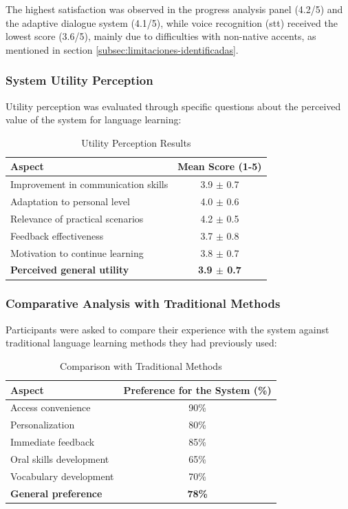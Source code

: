 The highest satisfaction was observed in the progress analysis panel (4.2/5) and the adaptive dialogue system (4.1/5), while voice recognition (\gls{stt}) received the lowest score (3.6/5), mainly due to difficulties with non-native accents, as mentioned in section \ref{subsec:limitaciones-identificadas}.


\subsubsection{System Utility Perception}
\label{subsubsec:percepcion_utilidad}

Utility perception was evaluated through specific questions about the perceived value of the system for language learning: 

\begin{table}[h]
\centering
\caption{Utility Perception Results}
\label{table:percepcion_utilidad}
\begin{tabular}{|l|c|}
\hline
\textbf{Aspect} & \textbf{Mean Score (1-5)} \\
\hline
Improvement in communication skills & 3.9 $\pm$ 0.7 \\
\hline
Adaptation to personal level & 4.0 $\pm$ 0.6 \\
\hline
Relevance of practical scenarios & 4.2 $\pm$ 0.5 \\
\hline
Feedback effectiveness & 3.7 $\pm$ 0.8 \\
\hline
Motivation to continue learning & 3.8 $\pm$ 0.7 \\
\hline
\textbf{Perceived general utility} & \textbf{3.9 $\pm$ 0.7} \\
\hline
\end{tabular}
\end{table}

\subsubsection{Comparative Analysis with Traditional Methods}
\label{subsubsec:comparacion_metodos}

Participants were asked to compare their experience with the system against traditional language learning methods they had previously used:

\begin{table}[h]
\centering
\caption{Comparison with Traditional Methods}
\label{table:comparacion_metodos}
\begin{tabular}{|l|c|}
\hline
\textbf{Aspect} & \textbf{Preference for the System (\%)} \\
\hline
Access convenience & 90\% \\
\hline
Personalization & 80\% \\
\hline
Immediate feedback & 85\% \\
\hline
Oral skills development & 65\% \\
\hline
Vocabulary development & 70\% \\
\hline
\textbf{General preference} & \textbf{78\%} \\
\hline
\end{tabular}
\end{table}

